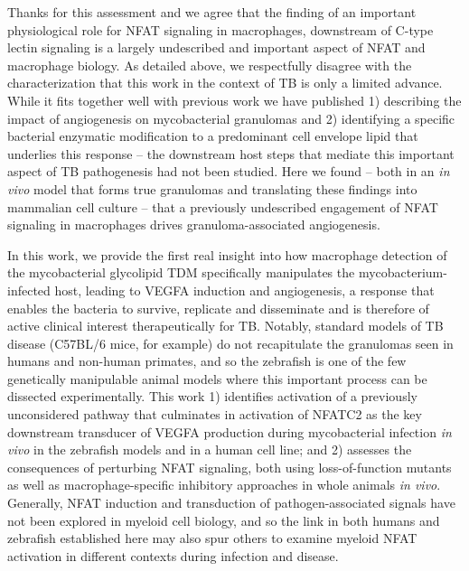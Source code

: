 \begin{description}[style=multiline, labelwidth=\widthof{Reviewer \#2:   }, font=\normalfont, leftmargin=\labelwidth, align=right]
\item[Response: ] \quad Thanks for this assessment and we agree that the finding of an important physiological role for NFAT signaling in macrophages, downstream of C\hyp{}type lectin signaling is a largely undescribed and important aspect of NFAT and macrophage biology. As detailed above, we respectfully disagree with the characterization that this work in the context of TB is only a limited advance. While it fits together well with previous work we have published 1) describing the impact of angiogenesis on mycobacterial granulomas \citep{Oehlers2015} and 2) identifying a specific bacterial enzymatic modification to a predominant cell envelope lipid that underlies this response \citep{Walton2018} – the downstream host steps that mediate this important aspect of TB pathogenesis had not been studied. Here we found – both in an \textit{in vivo} model that forms true granulomas and translating these findings into mammalian cell culture – that a previously undescribed engagement of NFAT signaling in macrophages drives granuloma\hyp{}associated angiogenesis.

\item \quad In this work, we provide the first real insight into how macrophage detection of the mycobacterial glycolipid TDM specifically manipulates the mycobacterium\hyp{}infected host, leading to VEGFA induction and angiogenesis, a response that enables the bacteria to survive, replicate and disseminate and is therefore of active clinical interest therapeutically for TB. Notably, standard models of TB disease (C57BL/6 mice, for example) do not recapitulate the granulomas seen in humans and non\hyp{}human primates, and so the zebrafish is one of the few genetically manipulable animal models where this important process can be dissected experimentally. This work 1) identifies activation of a previously unconsidered pathway that culminates in activation of NFATC2 as the key downstream transducer of VEGFA production during mycobacterial infection \textit{in vivo} in the zebrafish models and in a human cell line; and 2) assesses the consequences of perturbing NFAT signaling, both using loss\hyp{}of\hyp{}function mutants as well as macrophage\hyp{}specific inhibitory approaches in whole animals \textit{in vivo}. Generally, NFAT induction and transduction of pathogen\hyp{}associated signals have not been explored in myeloid cell biology, and so the link in both humans and zebrafish established here may also spur others to examine myeloid NFAT activation in different contexts during infection and disease.


\end{description}
